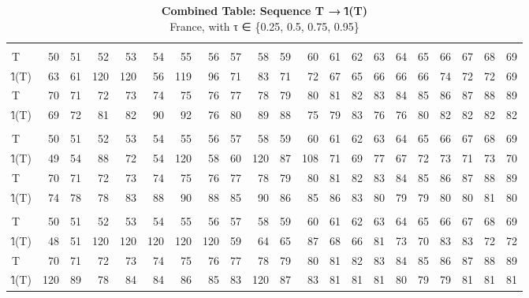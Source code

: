 \begin{table}[t]
\caption*{
{\large \textbf{Combined Table: Sequence T → l̂(T)}} \\ 
{\small France, with τ ∈ \{0.25, 0.5, 0.75, 0.95\}}
} 
\begin{tabular*}{\linewidth}{@{\extracolsep{\fill}}lrrrrrrrrrrrrrrrrrrrr}
\toprule
 &  &  &  &  &  &  &  &  &  &  &  &  &  &  &  &  &  &  &  &  \\ 
\midrule\addlinespace[2.5pt]
\multicolumn{21}{l}{τ = 0.25} \\[2.5pt] 
\midrule\addlinespace[2.5pt]
T & 50 & 51 & 52 & 53 & 54 & 55 & 56 & 57 & 58 & 59 & 60 & 61 & 62 & 63 & 64 & 65 & 66 & 67 & 68 & 69 \\ 
l̂(T) & 63 & 61 & 120 & 120 & 56 & 119 & 96 & 71 & 83 & 71 & 72 & 67 & 65 & 66 & 66 & 66 & 74 & 72 & 72 & 69 \\ 
T & 70 & 71 & 72 & 73 & 74 & 75 & 76 & 77 & 78 & 79 & 80 & 81 & 82 & 83 & 84 & 85 & 86 & 87 & 88 & 89 \\ 
l̂(T) & 69 & 72 & 81 & 82 & 90 & 92 & 76 & 80 & 89 & 88 & 75 & 79 & 83 & 76 & 76 & 80 & 82 & 82 & 82 & 82 \\ 
\midrule\addlinespace[2.5pt]
\multicolumn{21}{l}{τ = 0.5} \\[2.5pt] 
\midrule\addlinespace[2.5pt]
T & 50 & 51 & 52 & 53 & 54 & 55 & 56 & 57 & 58 & 59 & 60 & 61 & 62 & 63 & 64 & 65 & 66 & 67 & 68 & 69 \\ 
l̂(T) & 49 & 54 & 88 & 72 & 54 & 120 & 58 & 60 & 120 & 87 & 108 & 71 & 69 & 77 & 67 & 72 & 73 & 71 & 73 & 70 \\ 
T & 70 & 71 & 72 & 73 & 74 & 75 & 76 & 77 & 78 & 79 & 80 & 81 & 82 & 83 & 84 & 85 & 86 & 87 & 88 & 89 \\ 
l̂(T) & 74 & 78 & 78 & 83 & 88 & 90 & 88 & 85 & 90 & 86 & 85 & 86 & 83 & 80 & 79 & 79 & 80 & 80 & 81 & 80 \\ 
\midrule\addlinespace[2.5pt]
\multicolumn{21}{l}{τ = 0.75} \\[2.5pt] 
\midrule\addlinespace[2.5pt]
T & 50 & 51 & 52 & 53 & 54 & 55 & 56 & 57 & 58 & 59 & 60 & 61 & 62 & 63 & 64 & 65 & 66 & 67 & 68 & 69 \\ 
l̂(T) & 48 & 51 & 120 & 120 & 120 & 120 & 120 & 59 & 64 & 65 & 87 & 68 & 66 & 81 & 73 & 70 & 83 & 83 & 72 & 72 \\ 
T & 70 & 71 & 72 & 73 & 74 & 75 & 76 & 77 & 78 & 79 & 80 & 81 & 82 & 83 & 84 & 85 & 86 & 87 & 88 & 89 \\ 
l̂(T) & 120 & 89 & 78 & 84 & 84 & 86 & 85 & 83 & 120 & 87 & 83 & 81 & 81 & 81 & 80 & 79 & 79 & 81 & 81 & 81 \\ 

\end{tabular*}
\end{table}
